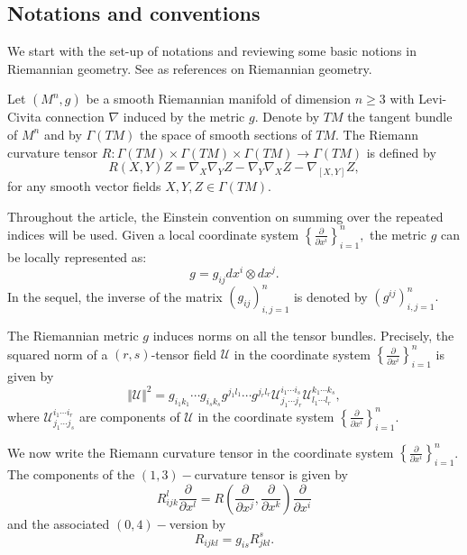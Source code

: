 \documentclass[10pt,leqno,oneside]{amsart}
\begin{document}
    \subsection{Notations and conventions}
        We start with the set-up of notations and reviewing some basic notions in Riemannian geometry.  See  {\cite{Bess1987} \cite{GHS2004} \cite{Petersen2016}} as references on Riemannian geometry.

        Let $(M^n, g)$ be a smooth Riemannian manifold of dimension $n\ge3$ with Levi-Civita connection $\nabla$ induced by the metric $g.$ Denote by $TM$ the tangent bundle of $M^n$ and by $\Gamma(TM)$ the space of smooth sections of $TM.$ The Riemann curvature tensor $R:\Gamma(TM)\times \Gamma(TM)\times \Gamma(TM)\rightarrow \Gamma(TM)$ is defined by
        $$R(X, Y) Z=\nabla_{X} \nabla_{Y} Z-\nabla_{Y} \nabla_{X} Z-\nabla_{[X, Y]} Z,$$
        for any smooth vector fields $X, Y,Z\in\Gamma(TM).$

        Throughout the article, the Einstein convention on summing over the repeated indices will be used. Given a local coordinate system $\left\{\frac{\partial}{\partial x^i}\right\}_{i=1}^n,$ the metric $g$ can be locally represented as:
        \[g=g_{ij}dx^i\otimes dx^j.\]
        In the sequel, the inverse of the matrix $(g_{ij})_{i,j=1}^n$ is denoted by  $(g^{ij})_{i,j=1}^n.$

        The Riemannian metric $g$ induces norms on all the tensor bundles. Precisely, the squared norm of a $(r,s)$-tensor field $\mathcal{U}$ in the coordinate system $\left\{\frac{\partial}{\partial x^i}\right\}_{i=1}^n$ is given by
        $$\Vert \mathcal{U}\Vert^2=g_{i_1k_1}\cdots g_{i_sk_s}g^{j_1l_1}\cdots g^{j_rl_r}\mathcal{U}_{j_1\cdots j_r}^{i_1\cdots i_s}\mathcal{U}_{l_1\cdots l_r}^{k_1\cdots k_s},$$
        where $\mathcal{U}_{j_1\cdots j_s}^{i_1\cdots i_r}$ are components of $\mathcal{U}$ in the coordinate system $\left\{\frac{\partial}{\partial x^i}\right\}_{i=1}^n.$


        We now write the Riemann curvature tensor in the coordinate system $\left\{\frac{\partial}{\partial x^i}\right\}_{i=1}^n$. The components of the $(1,3)-$curvature tensor is given by
        \[R_{i j k}^{l} \frac{\partial}{\partial x^{l}}= {R}(\frac{\partial}{\partial x^{j}}, \frac{\partial}{\partial x^k}) \frac{\partial}{\partial x^{i}}\]
        and the associated $(0,4)-$version by
        \[R_{i j k l}=g_{i s} R_{jkl}^{s}.\]
\end{document}
